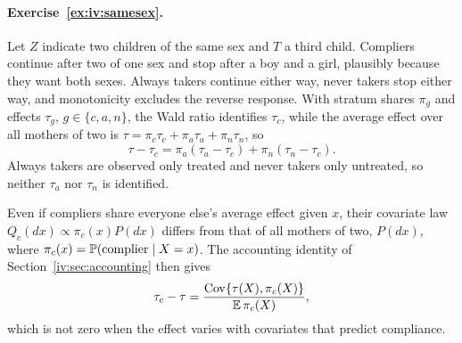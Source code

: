 \paragraph{Exercise~\ref{ex:iv:samesex}.} Let $Z$ indicate two children of the same sex and $T$ a third child. Compliers continue after two of one sex and stop after a boy and a girl, plausibly because they want both sexes. Always takers continue either way, never takers stop either way, and monotonicity excludes the reverse response. With stratum shares $\pi_g$ and effects $\tau_g$, $g \in \{c, a, n\}$, the Wald ratio identifies $\tau_c$, while the average effect over all mothers of two is $\tau = \pi_c\tau_c + \pi_a\tau_a + \pi_n\tau_n$, so
\[
\tau - \tau_c = \pi_a(\tau_a - \tau_c) + \pi_n(\tau_n - \tau_c).
\]
Always takers are observed only treated and never takers only untreated, so neither $\tau_a$ nor $\tau_n$ is identified.

Even if compliers share everyone else's average effect given $x$, their covariate law $Q_c(dx) \propto \pi_c(x)P(dx)$ differs from that of all mothers of two, $P(dx)$, where $\pi_c(x) = \mathbb{P}(\text{complier} \mid X = x)$. The accounting identity of Section~\ref{iv:sec:accounting} then gives
\[
\tau_c - \tau = \frac{\mathrm{Cov}\{\tau(X), \pi_c(X)\}}{\mathbb{E}\,\pi_c(X)},
\]
which is not zero when the effect varies with covariates that predict compliance.

